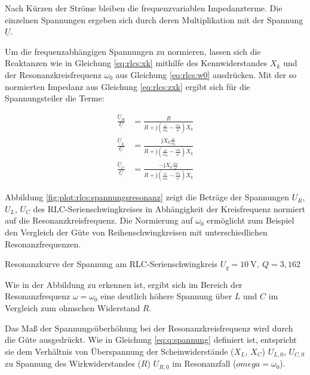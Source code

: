\begin{frame}
{    Nach Kürzen der Ströme bleiben die frequenzvariablen Impedanzterme. 
    Die einzelnen Spannungen ergeben sich durch deren Multiplikation mit der Spannung $\underline{U}$.

    Um die frequenzabhängigen Spannungen zu normieren, lassen sich die Reaktanzen wie in Gleichung \ref{eq:rlcs:xk} 
    mithilfe des Kennwiderstandes $X_k$ und der Resonanzkreisfrequenz $\omega_0$ aus Gleichung \ref{eq:rlcs:w0} ausdrücken. 
    Mit der so normierten Impedanz aus Gleichung \ref{eq:rlcs:zxk} ergibt sich für die Spannungsteiler die Terme:

    \begin{align*}
        \frac{\underline{U}_R}{\underline{U}} &= 
            \frac{R}{R+\mathrm{j}\left(\frac{\omega}{\omega_0}-\frac{\omega_0}{\omega}\right)X_k}\\
        \frac{\underline{U}_L}{\underline{U}} &=
            \frac{\mathrm{j}X_k\frac{\omega}{\omega_0}}{R+\mathrm{j}\left(\frac{\omega}{\omega_0}-\frac{\omega_0}{\omega}\right)X_k}\\
        \frac{\underline{U}_C}{\underline{U}} &= 
            \frac{-\mathrm{j}X_k\frac{\omega_0}{\omega}}{R+\mathrm{j}\left(\frac{\omega}{\omega_0}-\frac{\omega_0}{\omega}\right)X_k}
    \end{align*}

    Abbildung \ref{fig:plot:rlcs:spannungsresonanz} zeigt die Beträge der Spannungen $U_R$, $U_L$, $U_C$ des RLC-Serienschwingkreises 
    in Abhängigkeit der Kreisfrequenz normiert auf die Resonanzkreisfrequenz.
    Die Normierung auf $\omega_0$ ermöglicht zum Beispiel den Vergleich der Güte von Reihenschwingkreisen mit unterschiedlichen Resonanzfrequenzen.

    {Resonanzkurve der Spannung am RLC-Serienschwingkreis\newline
    $U_q=10\ \mathrm{V},\ Q=3,162$\label{fig:plot:rlcs:spannungsresonanz}}

    Wie in der Abbildung zu erkennen ist, ergibt sich im Bereich der Resonanzfrequenz $\omega = \omega_0$ 
    eine deutlich höhere Spannung über $L$ und $C$ im Vergleich zum ohmschen Widerstand $R$. 
    
    Das Maß der Spannungsüberhöhung bei der Resonanzkreisfrequenz wird durch die Güte ausgedrückt. 
    Wie in Gleichung \ref{eq:q:spannung} definiert ist, entspricht sie dem Verhältnis von Überspannung der Scheinwiderstände ($X_L$, $X_C$) $U_{L,0}$, $U_{C,0}$
    zu Spannung des Wirkwiderstandes ($R$) $U_{R,0}$ im Resonanzfall ($omega = \omega_0$). 

}
\end{frame}
